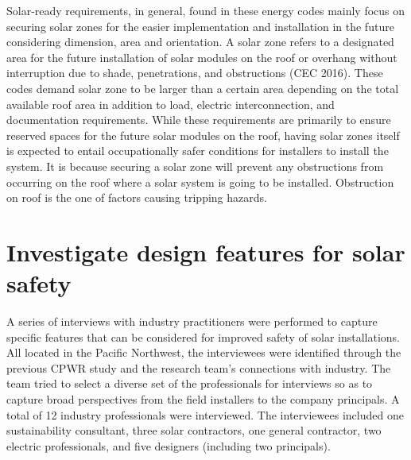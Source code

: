 \documentclass[]{article}
\begin{document}
Solar-ready requirements, in general, found in these energy codes mainly
focus on securing solar zones for the easier implementation and
installation in the future considering dimension, area and orientation.
A solar zone refers to a designated area for the future installation of
solar modules on the roof or overhang without interruption due to shade,
penetrations, and obstructions (CEC 2016). These codes demand solar zone
to be larger than a certain area depending on the total available roof
area in addition to load, electric interconnection, and documentation
requirements. While these requirements are primarily to ensure reserved
spaces for the future solar modules on the roof, having solar zones
itself is expected to entail occupationally safer conditions for
installers to install the system. It is because securing a solar zone
will prevent any obstructions from occurring on the roof where a solar
system is going to be installed. Obstruction on roof is the one of
factors causing tripping hazards.

\hypertarget{investigate-design-features-for-solar-safety}{%
\section{Investigate design features for solar
safety}\label{investigate-design-features-for-solar-safety}}

A series of interviews with industry practitioners were performed to
capture specific features that can be considered for improved safety of
solar installations. All located in the Pacific Northwest, the
interviewees were identified through the previous CPWR study and the
research team's connections with industry. The team tried to select a
diverse set of the professionals for interviews so as to capture broad
perspectives from the field installers to the company principals. A
total of 12 industry professionals were interviewed. The interviewees
included one sustainability consultant, three solar contractors, one
general contractor, two electric professionals, and five designers
(including two principals).
\end{document}
